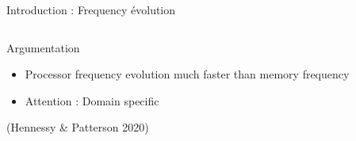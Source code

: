 \begin{Frame}{Introduction : Frequency évolution}
\begin{columns}[t]
\begin{column}{\BW}
\begin{block}{Argumentation}
\begin{itemize}
\item Processor frequency evolution much faster than memory frequency
\item Attention : Domain specific
\end{itemize}
(Hennessy \& Patterson 2020)
\end{block}

\end{column}
\begin{column}{\BW}
\begin{block}{}
\end{block}

\end{column}

\end{columns}

\end{Frame}

